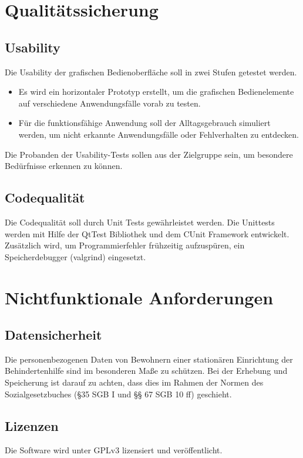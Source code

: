 \documentclass[a4paper,10pt]{article}
\begin{document}
\section{Qualitätssicherung}
\subsection{Usability}
Die Usability der grafischen Bedienoberfläche soll in zwei Stufen getestet werden.
\begin{itemize}
	\item Es wird ein horizontaler Prototyp erstellt,  um die grafischen Bedienelemente auf verschiedene Anwendungsfälle vorab zu testen. 
	\item Für die funktionsfähige Anwendung soll der Alltagsgebrauch simuliert werden, um nicht erkannte Anwendungsfälle oder Fehlverhalten zu entdecken.
\end{itemize}
Die Probanden der Usability-Tests sollen aus der Zielgruppe sein, um besondere Bedürfnisse erkennen zu können.    
\subsection{Codequalität}
Die Codequalität soll durch Unit Tests gewährleistet werden.
Die Unittests werden mit Hilfe der QtTest Bibliothek und dem CUnit Framework entwickelt.
Zusätzlich wird, um Programmierfehler frühzeitig aufzuspüren, ein Speicherdebugger (valgrind) eingesetzt.

\section{Nichtfunktionale Anforderungen} \label{sec:anf}
\subsection{Datensicherheit} \label{subsec:dasi}
Die personenbezogenen Daten von Bewohnern einer stationären Einrichtung der Behindertenhilfe sind im besonderen Maße zu schützen. Bei der Erhebung und Speicherung ist darauf zu achten, dass dies im Rahmen der Normen des Sozialgesetzbuches (§35 SGB I und §§ 67 SGB 10 ff) geschieht.
\subsection{Lizenzen}
Die Software wird unter GPLv3 lizensiert und veröffentlicht.
\end{document}

